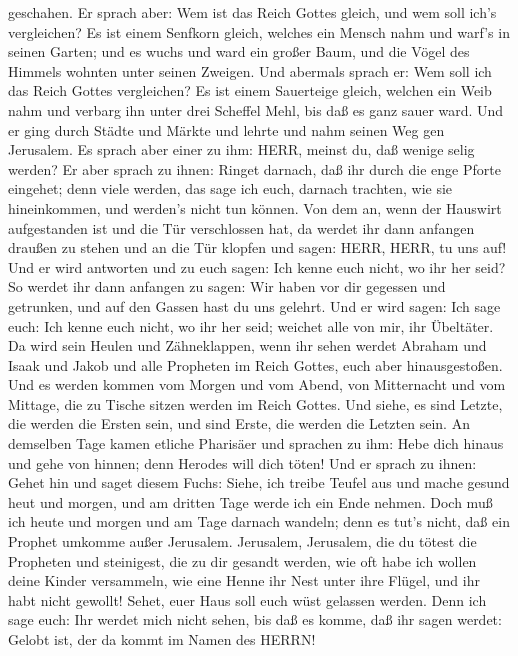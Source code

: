 geschahen.  Er sprach aber: Wem ist das Reich Gottes
gleich, und wem soll ich's vergleichen?  Es ist einem
Senfkorn gleich, welches ein Mensch nahm und warf's in seinen Garten;
und es wuchs und ward ein großer Baum, und die Vögel des Himmels wohnten
unter seinen Zweigen.  Und abermals sprach er: Wem soll ich
das Reich Gottes vergleichen?  Es ist einem Sauerteige
gleich, welchen ein Weib nahm und verbarg ihn unter drei Scheffel Mehl,
bis daß es ganz sauer ward.  Und er ging durch Städte und
Märkte und lehrte und nahm seinen Weg gen Jerusalem.  Es
sprach aber einer zu ihm: HERR, meinst du, daß wenige selig werden? Er
aber sprach zu ihnen:  Ringet darnach, daß ihr durch die
enge Pforte eingehet; denn viele werden, das sage ich euch, darnach
trachten, wie sie hineinkommen, und werden's nicht tun können.
 Von dem an, wenn der Hauswirt aufgestanden ist und die Tür
verschlossen hat, da werdet ihr dann anfangen draußen zu stehen und an
die Tür klopfen und sagen: HERR, HERR, tu uns auf! Und er wird antworten
und zu euch sagen: Ich kenne euch nicht, wo ihr her seid? 
So werdet ihr dann anfangen zu sagen: Wir haben vor dir gegessen und
getrunken, und auf den Gassen hast du uns gelehrt.  Und er
wird sagen: Ich sage euch: Ich kenne euch nicht, wo ihr her seid;
weichet alle von mir, ihr Übeltäter.  Da wird sein Heulen
und Zähneklappen, wenn ihr sehen werdet Abraham und Isaak und Jakob und
alle Propheten im Reich Gottes, euch aber hinausgestoßen. 
Und es werden kommen vom Morgen und vom Abend, von Mitternacht und vom
Mittage, die zu Tische sitzen werden im Reich Gottes.  Und
siehe, es sind Letzte, die werden die Ersten sein, und sind Erste, die
werden die Letzten sein.  An demselben Tage kamen etliche
Pharisäer und sprachen zu ihm: Hebe dich hinaus und gehe von hinnen;
denn Herodes will dich töten!  Und er sprach zu ihnen:
Gehet hin und saget diesem Fuchs: Siehe, ich treibe Teufel aus und mache
gesund heut und morgen, und am dritten Tage werde ich ein Ende nehmen.
 Doch muß ich heute und morgen und am Tage darnach wandeln;
denn es tut's nicht, daß ein Prophet umkomme außer Jerusalem.
 Jerusalem, Jerusalem, die du tötest die Propheten und
steinigest, die zu dir gesandt werden, wie oft habe ich wollen deine
Kinder versammeln, wie eine Henne ihr Nest unter ihre Flügel, und ihr
habt nicht gewollt!  Sehet, euer Haus soll euch wüst
gelassen werden. Denn ich sage euch: Ihr werdet mich nicht sehen, bis
daß es komme, daß ihr sagen werdet: Gelobt ist, der da kommt im Namen
des HERRN!

